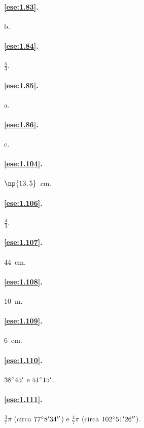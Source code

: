 \paragraph{\ref{ese:1.83}.}
b.

\paragraph{\ref{ese:1.84}.}
$\frac{5}{3}$.

\paragraph{\ref{ese:1.85}.}
a.

\paragraph{\ref{ese:1.86}.}
c.

\paragraph{\ref{ese:1.104}.}
$\np{13,5}$~cm.

\paragraph{\ref{ese:1.106}.}
$\frac{4}{3}$.

\paragraph{\ref{ese:1.107}.}
44~cm.

\paragraph{\ref{ese:1.108}.}
10~m.

\paragraph{\ref{ese:1.109}.}
6~cm.

\paragraph{\ref{ese:1.110}.}
$38{}^{\circ} 45'$ e $51{}^{\circ} 15'$.

\paragraph{\ref{ese:1.111}.}
$\frac{3}{7}\pi$ (circa $77{}^{\circ} 8' 34''$) e $\frac{4}{7}\pi$ (circa $102{}^{\circ} 51' 26''$).

